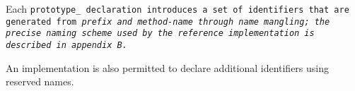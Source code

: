 Each \tt{prototype_} declaration introduces a set of identifiers that
are generated from \it{prefix} and \it{method-name} through name mangling;
the precise naming scheme used by the reference
implementation is described in appendix B.

\note An implementation is also permitted to
declare additional identifiers using reserved names.

\subsubsection{}


\subsubsection{}


\subsubsection{}


\subsubsection{}


